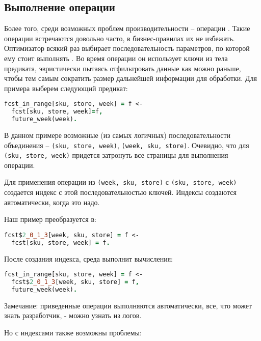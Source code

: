 \subsection{Выполнение операции \join}
\label{sec:technology:join}

Более того, среди возможных проблем производительности – операции \join. Такие операции встречаются довольно часто, в бизнес-правилах их не избежать. Оптимизатор всякий раз выбирает последовательность параметров, по которой ему стоит выполнять \join. Во время операции он использует ключи из тела предиката, эвристически пытаясь отфильтровать данные как можно раньше, чтобы тем самым сократить размер дальнейшей информации для обработки.
Для примера выберем следующий предикат:

\begin{lstlisting}[language=Prolog]
fcst_in_range[sku, store, week] = f <-
  fcst[sku, store, week]=f,
  future_week(week).
\end{lstlisting}

В данном примере возможные (из самых логичных) последовательности объединения – \lstinline{(sku, store, week)}, \lstinline{(week, sku, store)}. Очевидно, что для \lstinline{(sku, store, week)} придется затронуть все страницы для выполнения операции.

Для применения операции из \lstinline{(week, sku, store)} с \lstinline{(sku, store, week)} создается индекс с этой последовательностью ключей. Индексы создаются автоматически, когда это надо.

Наш пример преобразуется в:

\begin{lstlisting}[language=Prolog]
fcst$2_0_1_3[week, sku, store] = f <-
  fcst[sku, store, week] = f.
\end{lstlisting}

После создания индекса, среда выполнит вычисления:

\begin{lstlisting}[language=Prolog]
fcst_in_range[sku, store, week] = f <-
  fcst$2_0_1_3[week, sku, store] = f,
  future_week(week).
\end{lstlisting}

Замечание: приведенные операции выполняются автоматически, все, что может знать разработчик, - можно узнать из логов.

Но с индексами также возможны проблемы:


